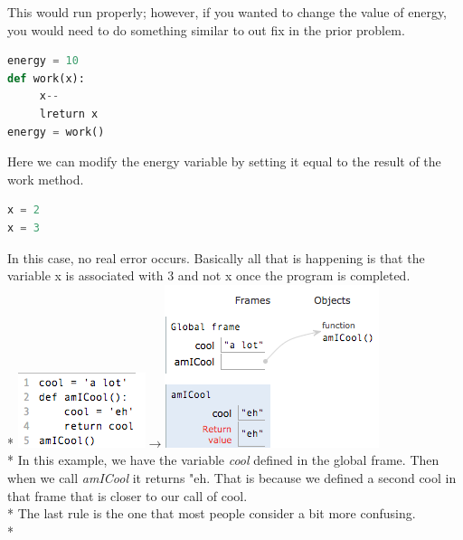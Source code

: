 \documentclass{article}
\begin{document}
This would run properly; however, if you wanted to change the value of energy, you would need to do something similar to out fix in the prior problem. 
\begin{lstlisting}[language = Python]
energy = 10
def work(x):
     x--
     lreturn x
energy = work()
\end{lstlisting}
Here we can modify the energy variable by setting it equal to the result of the work method. 
\begin{lstlisting}[language = Python]
x = 2
x = 3
\end{lstlisting}
In this case, no real error occurs. Basically all that is happening is that the variable x is associated with 3 and not x once the program is completed.  \\*
\includegraphics[scale=.7]{../images/cool1.png}{\Huge $\rightarrow$}\includegraphics[scale=.7]{../images/cool2.png} \\* \bigskip
In this example, we have the variable \emph{cool} defined in the global frame. Then when we call \emph{amICool} it returns "eh. That is because we defined a second cool in that frame that is closer to our call of cool. \\* \bigskip
The last rule is the one that most people consider a bit more confusing. \\* \bigskip
\end{document}

